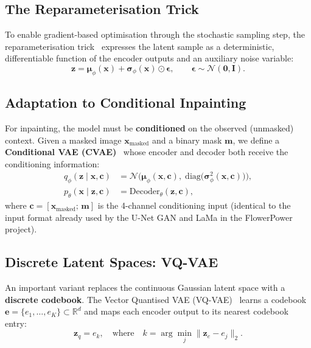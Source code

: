 \documentclass[11pt, a4paper]{article}
\newcommand{\reals}{\mathbb{R}}
\newcommand{\N}{\mathcal{N}}
\begin{document}
\subsection{The Reparameterisation Trick}

To enable gradient-based optimisation through the stochastic sampling step, the reparameterisation trick~\cite{kingma2014vae} expresses the latent sample as a deterministic, differentiable function of the encoder outputs and an auxiliary noise variable:
\begin{equation}
  \mathbf{z} = \boldsymbol{\mu}_\phi(\mathbf{x}) + \boldsymbol{\sigma}_\phi(\mathbf{x}) \odot \boldsymbol{\epsilon}, \qquad \boldsymbol{\epsilon} \sim \N(\mathbf{0}, \mathbf{I}).
  \label{eq:reparam}
\end{equation}

\subsection{Adaptation to Conditional Inpainting}
\label{sec:cvae}

For inpainting, the model must be \textbf{conditioned} on the observed (unmasked) context. Given a masked image \(\mathbf{x}_{\text{masked}}\) and a binary mask \(\mathbf{m}\), we define a \textbf{Conditional VAE (CVAE)}~\cite{sohn2015cvae} whose encoder and decoder both receive the conditioning information:
\begin{align}
  q_\phi(\mathbf{z} \mid \mathbf{x}, \mathbf{c}) &= \N\!\big(\boldsymbol{\mu}_\phi(\mathbf{x}, \mathbf{c}),\; \mathrm{diag}\!\big(\boldsymbol{\sigma}_\phi^2(\mathbf{x}, \mathbf{c})\big)\big), \label{eq:cvae_encoder} \\[4pt]
  p_\theta(\mathbf{x} \mid \mathbf{z}, \mathbf{c}) &= \text{Decoder}_\theta(\mathbf{z}, \mathbf{c}), \label{eq:cvae_decoder}
\end{align}
where \(\mathbf{c} = [\mathbf{x}_{\text{masked}};\, \mathbf{m}]\) is the 4-channel conditioning input (identical to the input format already used by the U-Net GAN and LaMa in the FlowerPower project).

\subsection{Discrete Latent Spaces: VQ-VAE}
\label{sec:vqvae}

An important variant replaces the continuous Gaussian latent space with a \textbf{discrete codebook}. The Vector Quantised VAE (VQ-VAE)~\cite{oord2017vqvae} learns a codebook \(\mathbf{e} = \{e_1, \ldots, e_K\} \subset \reals^d\) and maps each encoder output to its nearest codebook entry:
\begin{equation}
  \mathbf{z}_q = e_k, \quad \text{where} \quad k = \arg\min_j \| \mathbf{z}_e - e_j \|_2.
  \label{eq:vqvae}
\end{equation}
\end{document}
